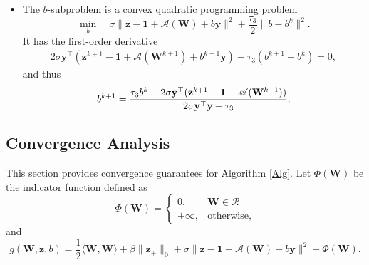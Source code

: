\documentclass[sn-mathphys]{JORSC-jnl}%
\theoremstyle{thmstyleone}%
\theoremstyle{thmstylethree}%
\theoremstyle{thmstyleone} %
\begin{document}
\begin{itemize}
\begin{equation*}
\begin{cases}
	(\frac{2\sigma}{\sigma+\tau_2}\mathbf{v}+\frac{\tau_2}{\sigma+\tau_2}\mathbf{z}^k)_i, &\quad \text{otherwise}.
\end{cases} 
\end{equation*}
    \item The $b$-subproblem is a convex quadratic programming problem
\begin{equation*}
\min\limits_{b}\quad\sigma\|{\mathbf{z}}-{\mathbf{1}}+\mathscr{A}(\mathbf{W})+b\mathbf{y}\|^{2}+\frac{\tau_{3}}{2}\|b-b^k\|^2.
\end{equation*}
It has the first-order derivative
\begin{equation*}
	\begin{aligned}
		2 \sigma \mathbf{\mathbf{y}}^\top ( \mathbf{z}^{k+1} - \mathbf{{\mathbf{1}}} + \mathscr{A}(\mathbf{W}^{k+1}) + b^{k+1} \mathbf{\mathbf{y}} )+\tau_3(b^{k+1}-b^k)=0,
	\end{aligned}
\end{equation*}
and thus
$$b^{k+1}=\\
\frac{\tau_3b^k-2\sigma\mathbf{y}^\top({\mathbf{z}}^{k+1}-{\mathbf{1}}+\mathscr{A}(\mathbf W^{k+1}))}{2\sigma\mathbf{y}^\top\mathbf{y}+\tau_3}.$$
\end{itemize}




\subsection{Convergence Analysis}
This section provides convergence guarantees for Algorithm \ref{Alg}.  Let $\Phi(\mathbf{W})$ be the  indicator function defined as
\begin{equation*}
	\Phi(\mathbf{W})=\begin{cases}
		0,  & \mathbf{W}\in\mathcal{R} \\
		+\infty, & \text{otherwise},
	\end{cases}
\end{equation*}
and
\begin{equation*}
g(\mathbf{W},\mathbf{z},b)=\frac{1}{2}\langle\mathbf W,\mathbf W\rangle+\beta\|{\mathbf{z}}_+\|_0+\sigma\|{\mathbf{z}}-{\mathbf{1}}+\mathscr{A}(\mathbf{W})+b\mathbf{y}\|^{2}+\Phi(\mathbf{W}).
\end{equation*}
\end{document}
